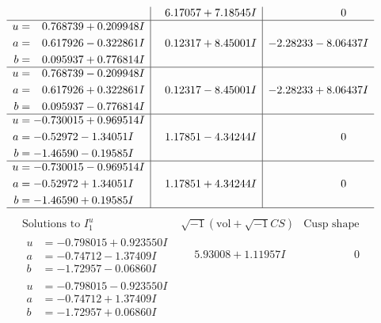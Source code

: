 \documentclass[1p]{elsarticle_modified}
\theoremstyle{definition}
\newcommand{\I}{\sqrt{-1}}
\begin{document}
$$\begin{array}{c|c|c}
 & \phantom{-}6.17057 + 7.18545 I & \phantom{-0.000000 } 0 \\ \hline\begin{aligned}
u &= \phantom{-}0.768739 + 0.209948 I \\
a &= \phantom{-}0.617926 - 0.322861 I \\
b &= \phantom{-}0.095937 + 0.776814 I\end{aligned}
 & \phantom{-}0.12317 + 8.45001 I & -2.28233 - 8.06437 I \\ \hline\begin{aligned}
u &= \phantom{-}0.768739 - 0.209948 I \\
a &= \phantom{-}0.617926 + 0.322861 I \\
b &= \phantom{-}0.095937 - 0.776814 I\end{aligned}
 & \phantom{-}0.12317 - 8.45001 I & -2.28233 + 8.06437 I \\ \hline\begin{aligned}
u &= -0.730015 + 0.969514 I \\
a &= -0.52972 - 1.34051 I \\
b &= -1.46590 - 0.19585 I\end{aligned}
 & \phantom{-}1.17851 - 4.34244 I & \phantom{-0.000000 } 0 \\ \hline\begin{aligned}
u &= -0.730015 - 0.969514 I \\
a &= -0.52972 + 1.34051 I \\
b &= -1.46590 + 0.19585 I\end{aligned}
 & \phantom{-}1.17851 + 4.34244 I & \phantom{-0.000000 } 0\\
 \hline 
 \end{array}$$\newpage$$\begin{array}{c|c|c}  
\text{Solutions to }I^u_{1}& \I (\text{vol} + \sqrt{-1}CS) & \text{Cusp shape}\\
 \hline 
\begin{aligned}
u &= -0.798015 + 0.923550 I \\
a &= -0.74712 - 1.37409 I \\
b &= -1.72957 - 0.06860 I\end{aligned}
 & \phantom{-}5.93008 + 1.11957 I & \phantom{-0.000000 } 0 \\ \hline\begin{aligned}
u &= -0.798015 - 0.923550 I \\
a &= -0.74712 + 1.37409 I \\
b &= -1.72957 + 0.06860 I\end{aligned}

\end{array}$$
\end{document}
